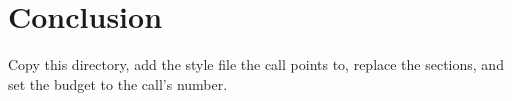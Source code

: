 \section{Conclusion}

Copy this directory, add the style file the call points to, replace the
sections, and set the budget to the call's number.

